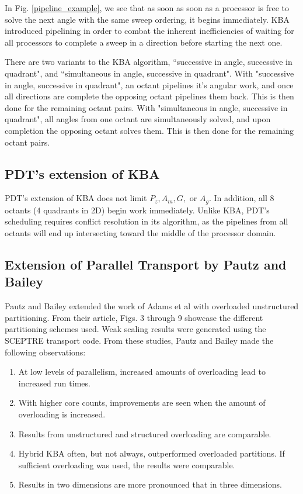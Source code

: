 \documentclass[11pt, letterpaper,titlepage,oneside]{article}
\begin{document}
In Fig. \ref{pipeline_example}, we see that as soon as soon as a processor is free to solve the next angle with the same sweep ordering, it begins immediately. KBA introduced pipelining in order to combat the inherent inefficiencies of waiting for all processors to complete a sweep in a direction before starting the next one. 

There are two variants to the KBA algorithm, ``successive in angle, successive in quadrant", and ``simultaneous in angle, successive in quadrant".  With "successive in angle, successive in quadrant", an octant pipelines it's angular work, and once all directions are complete the opposing octant pipelines them back. This is then done for the remaining octant pairs. With "simultaneous in angle, successive in quadrant", all angles from one octant are simultaneously solved, and upon completion the opposing octant solves them. This is then done for the remaining octant pairs.

\subsection{PDT's extension of KBA}

PDT's extension of KBA does not limit $P_z, A_m, G,$ or $A_g$. In addition, all 8 octants (4 quadrants in 2D) begin work immediately. Unlike KBA, PDT's scheduling requires conflict resolution in its algorithm, as the pipelines from all octants will end up intersecting toward the middle of the processor domain.

\subsection{Extension of Parallel Transport by Pautz and Bailey}
Pautz and Bailey\cite{PautzBailey} extended the work of Adams et al with overloaded unstructured partitioning. From their article, Figs. 3 through 9\cite{PautzBailey} showcase the different partitioning schemes used.  Weak scaling results were generated using the SCEPTRE transport code\cite{sceptre}. From these studies, Pautz and Bailey made the following observations:
\begin{enumerate}
	\item At low levels of parallelism, increased amounts of overloading lead to increased run times.
	\item With higher core counts, improvements are seen when the amount of overloading is increased.
	\item Results from unstructured and structured overloading are comparable. 
	\item Hybrid KBA often, but not always, outperformed overloaded partitions. If sufficient overloading was used, the results were comparable.
	\item Results in two dimensions are more pronounced that in three dimensions.
\end{enumerate}
\end{document}

